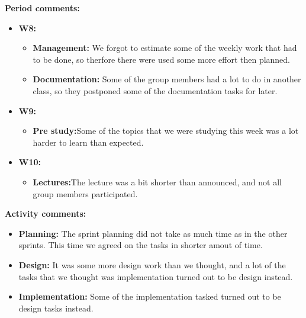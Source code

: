 \textbf{Period comments:}
\begin{itemize}
\item{}\textbf{W8:}
\begin{itemize}
\item{}\textbf{Management:} We forgot to estimate some of the weekly work that had to be done, so therfore there were used some more effort then planned.
\item{}\textbf{Documentation:} Some of the group members had a lot to do in another class, so they postponed some of the documentation tasks for later.
\end{itemize}
\item{}\textbf{W9:}
\begin{itemize}
\item{}\textbf{Pre study:}Some of the topics that we were studying this week was a lot harder to learn than expected.
\end{itemize}
\item{}\textbf{W10:}
\begin{itemize}
\item{}\textbf{Lectures:}The lecture was a bit shorter than announced, and not all group members participated.
\end{itemize}
\end{itemize}

\newpage

\textbf{Activity comments:}
\begin{itemize}
\item{}\textbf{Planning:} The sprint planning did not take as much time as in the other sprints. This time we agreed on the tasks in shorter amout of time.
\item{}\textbf{Design:} It was some more design work than we thought, and a lot of the tasks that we thought was implementation turned out to be design instead.
\item{}\textbf{Implementation:} Some of the implementation tasked turned out to be design tasks instead.
\end{itemize}